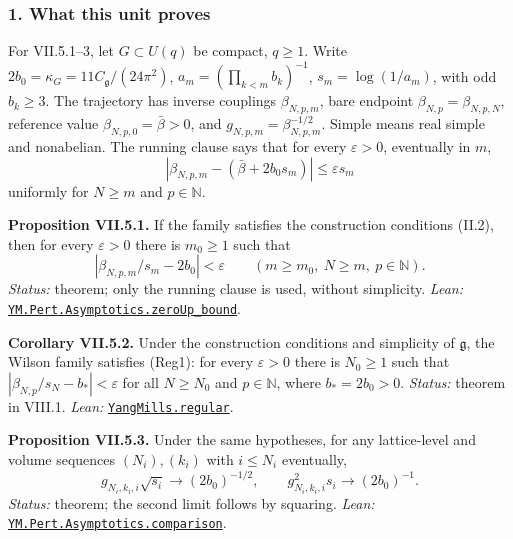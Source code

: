 \documentclass[
  letterpaper,
  11pt]{article}
\begin{document}
\subsubsection{1. What this unit proves}\label{what-this-unit-proves-29}

For VII.5.1--3, let \(G\subset U(q)\) be compact, \(q\ge1\). Write
\(2b_0=\kappa_G=11C_{\mathfrak g}/(24\pi^2)\),
\(a_m=(\prod_{k<m}b_k)^{-1}\), \(s_m=\log(1/a_m)\), with odd
\(b_k\ge3\). The trajectory has inverse couplings \(\beta_{N,p,m}\),
bare endpoint \(\beta_{N,p}=\beta_{N,p,N}\), reference value
\(\beta_{N,p,0}=\bar\beta>0\), and \(g_{N,p,m}=\beta_{N,p,m}^{-1/2}\).
Simple means real simple and nonabelian. The running clause says that
for every \(\varepsilon>0\), eventually in \(m\),
\[|\beta_{N,p,m}-(\bar\beta+2b_0s_m)|\le\varepsilon s_m\] uniformly for
\(N\ge m\) and \(p\in\mathbb N\).

\textbf{Proposition VII.5.1.} If the family satisfies the construction
conditions (II.2), then for every \(\varepsilon>0\) there is \(m_0\ge1\)
such that
\[\left|\beta_{N,p,m}/s_m-2b_0\right|<\varepsilon\qquad(m\ge m_0,\ N\ge m,\ p\in\mathbb N).\]
\emph{Status:} theorem; only the running clause is used, without
simplicity. \emph{Lean:}
\href{https://github.com/yang-mills-group/OpenAI-YM-20261028/blob/3456e5e75cf8d4cd558955a5c7638fba2d68f464/YM/Pert/Asymptotics/RawAxis.lean\#L15-L30}{\texttt{YM.Pert.Asymptotics.zeroUp\_bound}}.

\textbf{Corollary VII.5.2.} Under the construction conditions and
simplicity of \(\mathfrak g\), the Wilson family satisfies (Reg1): for
every \(\varepsilon>0\) there is \(N_0\ge1\) such that
\(|\beta_{N,p}/s_N-b_*|<\varepsilon\) for all \(N\ge N_0\) and
\(p\in\mathbb N\), where \(b_*=2b_0>0\). \emph{Status:} theorem in
VIII.1. \emph{Lean:}
\href{https://github.com/yang-mills-group/OpenAI-YM-20261028/blob/3456e5e75cf8d4cd558955a5c7638fba2d68f464/HierarchyBridge.lean\#L16-L25}{\texttt{YangMills.regular}}.

\textbf{Proposition VII.5.3.} Under the same hypotheses, for any
lattice-level and volume sequences \((N_i),(k_i)\) with \(i\le N_i\)
eventually,
\[g_{N_i,k_i,i}\sqrt{s_i}\longrightarrow(2b_0)^{-1/2},\qquad g_{N_i,k_i,i}^2s_i\longrightarrow(2b_0)^{-1}.\]
\emph{Status:} theorem; the second limit follows by squaring.
\emph{Lean:}
\href{https://github.com/yang-mills-group/OpenAI-YM-20261028/blob/3456e5e75cf8d4cd558955a5c7638fba2d68f464/YM/Pert/Asymptotics/RawAxis.lean\#L36-L48}{\texttt{YM.Pert.Asymptotics.comparison}}.
\end{document}
